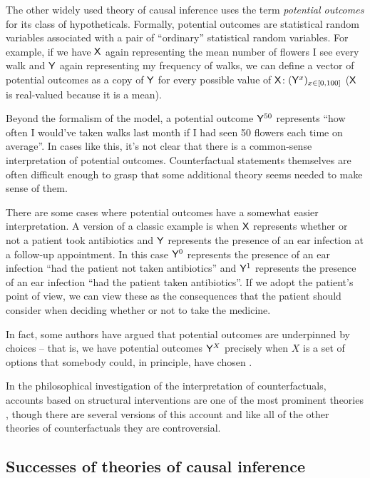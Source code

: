 The other widely used theory of causal inference uses the term \emph{potential outcomes} for its class of hypotheticals. Formally, potential outcomes are statistical random variables associated with a pair of ``ordinary'' statistical random variables. For example, if we have $\mathsf{X}$ again representing the mean number of flowers I see every walk and $\mathsf{Y}$ again representing my frequency of walks, we can define a vector of potential outcomes as a copy of $\mathsf{Y}$ for every possible value of $\mathsf{X}$: $(\mathsf{Y}^x)_{x\in [0,100]}$ ($\mathsf{X}$ is real-valued because it is a mean). 

Beyond the formalism  of the model, a potential outcome $\mathsf{Y}^{50}$ represents ``how often I would've taken walks last month if I had seen 50 flowers each time on average''. In cases like this, it's not clear that there is a common-sense interpretation of potential outcomes. Counterfactual statements themselves are often difficult enough to grasp that some additional theory seems needed to make sense of them.

There are some cases where potential outcomes have a somewhat easier interpretation. A version of a classic example is when $\mathsf{X}$ represents whether or not a patient took antibiotics and $\mathsf{Y}$ represents the presence of an ear infection at a follow-up appointment. In this case $\mathsf{Y}^0$ represents the presence of an ear infection ``had the patient not taken antibiotics'' and $\mathsf{Y}^1$ represents the presence of an ear infection ``had the patient taken antibiotics''. If we adopt the patient's point of view, we can view these as the consequences that the patient should consider when deciding whether or not to take the medicine.

In fact, some authors have argued that potential outcomes are underpinned by choices -- that is, we have potential outcomes $\mathsf{Y}^X$ precisely when $X$ is a set of options that somebody could, in principle, have chosen \citep[~pg. 4]{imbens_causal_2015}. 

In the philosophical investigation of the interpretation of counterfactuals, accounts based on structural interventions are one of the most prominent theories \citep[Section 3.3]{starr_counterfactuals_2021}, though there are several versions of this account and like all of the other theories of counterfactuals they are controversial.

\subsection{Successes of theories of causal inference}


